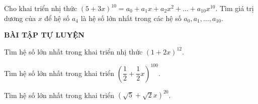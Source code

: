 \begin{vd}%
 Cho khai triển nhị thức $\left(5+3x\right)^{10}=a_0+a_1x+a_2x^2+\ldots+a_{10}x^{10}$. Tìm giá trị dương của $x$ để hệ số $a_4$ là hệ số lớn nhất trong các hệ số $a_0, a_1, \ldots, a_{10}$.
\end{vd}
\begin{center}
\textbf{BÀI TẬP TỰ LUYỆN}
\end{center}
\begin{bt}%
Tìm hệ số lớn nhất trong khai triển nhị thức $\left(1+2x\right)^{12}$.
\end{bt}
\begin{bt}%
Tìm hệ số lớn nhất trong khai triển $\left( \dfrac{1}{2} + \dfrac{1}{2}x \right)^{100}$.
\end{bt}
\begin{bt}%
    Tìm hệ số lớn nhất trong khai triển $\left( \sqrt{5} + \sqrt{2} x\right)^{20}$.
\end{bt}


